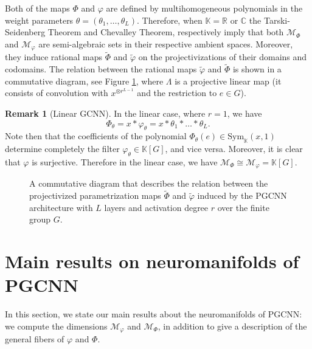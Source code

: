 \documentclass[final]{article}
\newcommand{\C}{\mathbb{C}}
\newcommand{\R}{\mathbb{R}}
\newcommand{\K}{\mathbb{K}}
\newcommand{\PP}{\mathbb{P}}
\newcommand{\Sym}{\text{Sym}}
\newcommand{\conv}{\ast}
\theoremstyle{definition}
\newtheorem{remark}[definition]{Remark}
\theoremstyle{plain}
\begin{document}
Both of the maps $\Phi$ and $\varphi$ are defined by multihomogeneous polynomials in the weight parameters $\theta=(\theta_1, \dots, \theta_L)$. Therefore, when $\K=\R$ or $\C$ the Tarski-Seidenberg Theorem and Chevalley Theorem, respectively imply that both $\mathcal{M}_\Phi$ and $\mathcal{M}_\varphi$ are semi-algebraic sets in their respective ambient spaces. 
Moreover, they induce rational maps $\tilde \Phi$ and $\tilde\varphi$ on the projectivizations of their domains and codomains.
The relation between the rational maps $\tilde \varphi$ and $\tilde \Phi$ is shown in a commutative diagram, see Figure \ref{fig: varphi_Phi_Lambda}, where $\Lambda$ is a projective linear map (it consists of convolution with $x^{\otimes r^{L-1}}$ and the restriction to $e\in G$).

\begin{remark}[Linear GCNN]
    In the linear case, where $r=1$, we have 
    \[
    \Phi_\theta = x\conv \varphi_\theta = x \conv \theta_1 \conv \dots \conv \theta_L.
    \]
    Note then that the coefficients of the polynomial $\Phi_\theta(e) \in \Sym_\K(x, 1)$ determine completely the filter $\varphi_\theta \in \K[G]$, and vice versa. 
    Moreover, it is clear that $\varphi$ is surjective.
    Therefore in the linear case, we have $\mathcal{M}_\Phi \cong \mathcal{M}_\varphi = \K[G]$.
\end{remark}


\begin{figure}
 \centering
{}
\caption{A commutative diagram that describes the relation between the projectivized parametrization maps $\tilde \Phi$ and $\tilde \varphi$ induced by the PGCNN architecture with $L$ layers and activation degree $r$ over the finite group $G$.}
\label{fig: varphi_Phi_Lambda}
\end{figure}




\section{Main results on neuromanifolds of PGCNN}\label{sec: main_results}

In this section, we state  our main results about the neuromanifolds of PGCNN: we compute the dimensions $\mathcal{M}_\varphi$ and $\mathcal{M}_\Phi$, in addition to give a description of the general fibers of $\varphi$ and $\Phi$.
\end{document}
